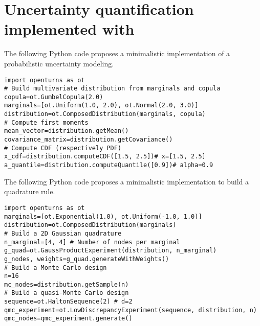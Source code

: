 \chapter{Uncertainty quantification implemented with \ot}
\label{apx:E}



\begin{otexample}
    The following Python code proposes a minimalistic \ot implementation of a probabilistic uncertainty modeling. 
    \lstset{style=mystyle, language=python}
\begin{lstlisting}
import openturns as ot
# Build multivariate distribution from marginals and copula
copula=ot.GumbelCopula(2.0)
marginals=[ot.Uniform(1.0, 2.0), ot.Normal(2.0, 3.0)]
distribution=ot.ComposedDistribution(marginals, copula)
# Compute first moments
mean_vector=distribution.getMean()
covariance_matrix=distribution.getCovariance()
# Compute CDF (respectively PDF)
x_cdf=distribution.computeCDF([1.5, 2.5])# x=[1.5, 2.5]
a_quantile=distribution.computeQuantile([0.9])# alpha=0.9
\end{lstlisting}
\end{otexample}

\begin{otexample}
    The following Python code proposes a minimalistic \ot implementation to build a quadrature rule. 
\lstset{style=mystyle, language=python}
\begin{lstlisting}
import openturns as ot
marginals=[ot.Exponential(1.0), ot.Uniform(-1.0, 1.0)]
distribution=ot.ComposedDistribution(marginals)
# Build a 2D Gaussian quadrature
n_marginal=[4, 4] # Number of nodes per marginal
g_quad=ot.GaussProductExperiment(distribution, n_marginal)
g_nodes, weights=g_quad.generateWithWeights()
# Build a Monte Carlo design
n=16 
mc_nodes=distribution.getSample(n)
# Build a quasi-Monte Carlo design
sequence=ot.HaltonSequence(2) # d=2
qmc_experiment=ot.LowDiscrepancyExperiment(sequence, distribution, n)
qmc_nodes=qmc_experiment.generate()
\end{lstlisting}
\end{otexample}


